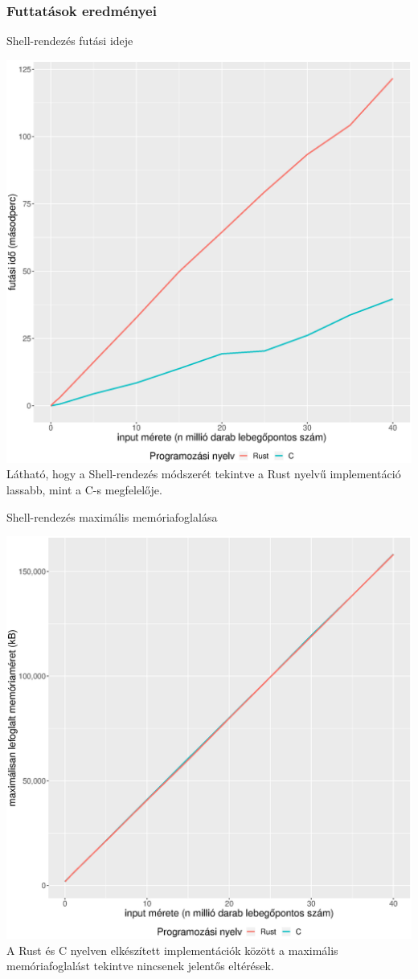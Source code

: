 \subsubsection{Futtatások eredményei}
Shell-rendezés futási ideje

\includegraphics[width=15.5cm]{kepek/shells_sort_run.eps}
Látható, hogy a Shell-rendezés módszerét tekintve a Rust nyelvű implementáció lassabb, mint a C-s megfelelője.

\noindent Shell-rendezés maximális memóriafoglalása

\includegraphics[width=15.5cm]{kepek/shells_sort_memory.eps}
A Rust és C nyelven elkészített implementációk között a maximális memóriafoglalást tekintve nincsenek jelentős eltérések.

